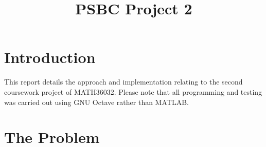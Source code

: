 \documentclass[10pt]{article}
\title{PSBC Project 2}
\newcommand{\inlinemaketitle}{{\let\newpage\relax\maketitle}}
\begin{document}
\inlinemaketitle
\section{Introduction}

This report details the approach and implementation relating to the second coursework project of MATH36032. Please note that all programming and testing was carried out using GNU Octave rather than MATLAB.

\section{The Problem}




\begin{appendices}


\end{appendices}

\begin{thebibliography}{9}
\end{thebibliography}
\end{document}
